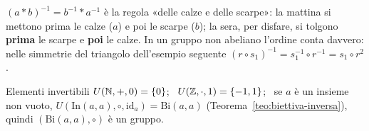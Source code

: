 \begin{spiegazione}
    $(a * b)^{-1} = b^{-1} * a^{-1}$ è la regola «delle calze e delle scarpe»: la mattina si mettono prima le calze ($a$) e poi le scarpe ($b$); la sera, per
    disfare, si tolgono \textbf{prima} le scarpe e \textbf{poi} le calze. In un gruppo non abeliano l'ordine conta davvero: nelle simmetrie del triangolo dell'esempio
    seguente $(r \circ s_1)^{-1} = s_1^{-1} \circ r^{-1} = s_1 \circ r^2$.
\end{spiegazione}


\begin{esempio}{Elementi invertibili}
    $U(\mathbb{N}, +, 0) = \{0\}$; \ $U(\mathbb{Z}, \cdot, 1) = \{-1, 1\}$; \ se $a$ è un insieme non vuoto, $U(\mathrm{In}(a, a), \circ, \mathrm{id}_a) = \mathrm{Bi}(a, a)$
    (Teorema~\ref{teo:biettiva-inversa}), quindi $(\mathrm{Bi}(a, a), \circ)$ è un gruppo.
\end{esempio}

